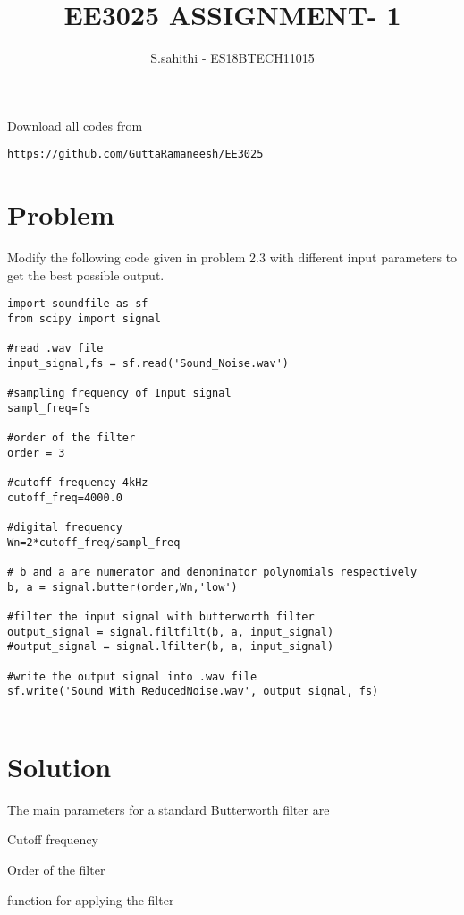 \documentclass[journal,12pt,twocolumn]{IEEEtran}
\begin{document}
     \def\rightbox#1{\makebox[0in][r]{#1}}
     \def\centbox#1{\makebox[0in]{#1}}
     \def\topbox#1{\raisebox{-\baselineskip}[0in][0in]{#1}}
     \def\midbox#1{\raisebox{-0.5\baselineskip}[0in][0in]{#1}}
\vspace{3cm}
\title{EE3025 ASSIGNMENT- 1}
\author{S.sahithi - ES18BTECH11015}
\maketitle
\newpage
\bigskip
\renewcommand{\thefigure}{\theenumi}
\renewcommand{\thetable}{\theenumi}
Download all codes from 
\begin{lstlisting}
https://github.com/GuttaRamaneesh/EE3025
\end{lstlisting}
%
\section{\textbf{Problem}}
    
Modify the following code given in problem 2.3 with different input parameters to get the best possible output.
\begin{lstlisting}
import soundfile as sf
from scipy import signal
    
#read .wav file
input_signal,fs = sf.read('Sound_Noise.wav')
    
#sampling frequency of Input signal
sampl_freq=fs
    
#order of the filter
order = 3
    
#cutoff frequency 4kHz
cutoff_freq=4000.0
    
#digital frequency
Wn=2*cutoff_freq/sampl_freq
    
# b and a are numerator and denominator polynomials respectively
b, a = signal.butter(order,Wn,'low')
    
#filter the input signal with butterworth filter
output_signal = signal.filtfilt(b, a, input_signal)
#output_signal = signal.lfilter(b, a, input_signal)
    
#write the output signal into .wav file
sf.write('Sound_With_ReducedNoise.wav', output_signal, fs)
    
\end{lstlisting}
  \section{\textbf{Solution}}
  The main parameters for a standard Butterworth filter are
  \begin{description}[font=$\bullet$\scshape\bfseries]
  \item[]{Cutoff frequency}
  \item[]{Order of the filter}
  \item[]{function for applying the filter}
  \end{description}
  
\end{document}
